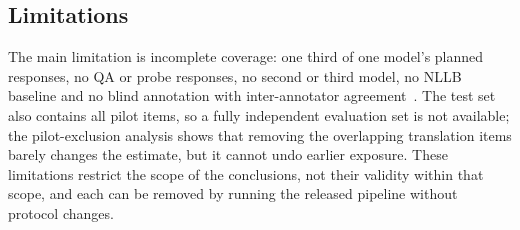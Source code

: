 \subsection{Limitations}
The main limitation is incomplete coverage: one third of one model's planned responses, no QA or probe responses, no second or third model, no NLLB baseline and no blind annotation with inter-annotator agreement~\cite{cohen1960}. The test set also contains all pilot items, so a fully independent evaluation set is not available; the pilot-exclusion analysis shows that removing the overlapping translation items barely changes the estimate, but it cannot undo earlier exposure. These limitations restrict the scope of the conclusions, not their validity within that scope, and each can be removed by running the released pipeline without protocol changes.
